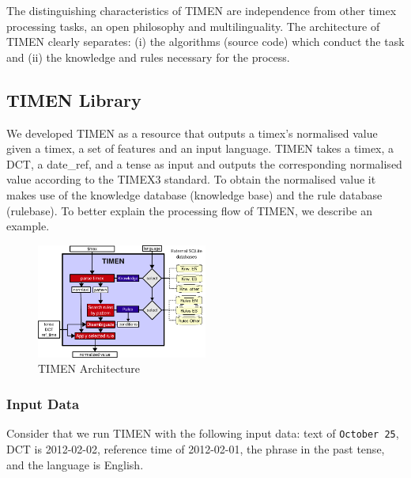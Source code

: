 \documentclass[10pt, a4paper]{article}
\begin{document}
The distinguishing characteristics of TIMEN are independence from other timex processing tasks, an open philosophy and multilinguality. The architecture of TIMEN clearly separates: (i) the algorithms (source code) which conduct the task and (ii) the knowledge and rules necessary for the process.

\subsection{TIMEN Library}

We developed TIMEN as a resource that outputs a timex's normalised value given a timex, a set of features and an input language.
TIMEN takes a timex, a DCT, a date\_ref, and a tense as input and outputs the corresponding normalised value according to the TIMEX3 standard.
To obtain the normalised value it makes use of the knowledge database (knowledge base) and the rule database (rulebase).
To better explain the processing flow of TIMEN, we describe an example.


\begin{figure}[htbp]
 \begin{center}
  \includegraphics[width=0.5\textwidth,clip]{eps/TIMEN-architecture-TIMEN-detail.pdf}
  \caption{TIMEN Architecture}
  \label{fig:TIMEN}
  \end{center}
\end{figure}


\subsubsection{Input Data}
Consider that we run TIMEN with the following input data: text of \texttt{October 25}, DCT is 2012-02-02, reference time of 2012-02-01, the phrase in the past tense, and the language is English. 
\end{document}
